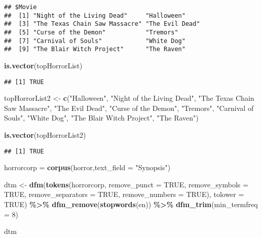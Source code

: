 \documentclass[
]{article}
\newenvironment{Shaded}{\begin{snugshade}}{\end{snugshade}}
\newcommand{\AttributeTok}[1]{\textcolor[rgb]{0.13,0.29,0.53}{#1}}
\newcommand{\ConstantTok}[1]{\textcolor[rgb]{0.56,0.35,0.01}{#1}}
\newcommand{\DecValTok}[1]{\textcolor[rgb]{0.00,0.00,0.81}{#1}}
\newcommand{\FunctionTok}[1]{\textcolor[rgb]{0.13,0.29,0.53}{\textbf{#1}}}
\newcommand{\NormalTok}[1]{#1}
\newcommand{\OtherTok}[1]{\textcolor[rgb]{0.56,0.35,0.01}{#1}}
\newcommand{\SpecialCharTok}[1]{\textcolor[rgb]{0.81,0.36,0.00}{\textbf{#1}}}
\newcommand{\StringTok}[1]{\textcolor[rgb]{0.31,0.60,0.02}{#1}}
\begin{document}
\begin{verbatim}
## $Movie
##  [1] "Night of the Living Dead"     "Halloween"                   
##  [3] "The Texas Chain Saw Massacre" "The Evil Dead"               
##  [5] "Curse of the Demon"           "Tremors"                     
##  [7] "Carnival of Souls"            "White Dog"                   
##  [9] "The Blair Witch Project"      "The Raven"
\end{verbatim}

\begin{Shaded}
\begin{Highlighting}[]
\FunctionTok{is.vector}\NormalTok{(topHorrorList)}
\end{Highlighting}
\end{Shaded}

\begin{verbatim}
## [1] TRUE
\end{verbatim}

\begin{Shaded}
\begin{Highlighting}[]
\NormalTok{topHorrorList2 }\OtherTok{\textless{}{-}} \FunctionTok{c}\NormalTok{(}\StringTok{"Halloween"}\NormalTok{, }\StringTok{"Night of the Living Dead"}\NormalTok{, }\StringTok{"The Texas Chain Saw Massacre"}\NormalTok{, }
                   \StringTok{"The Evil Dead"}\NormalTok{, }\StringTok{"Curse of the Demon"}\NormalTok{, }\StringTok{"Tremors"}\NormalTok{, }\StringTok{"Carnival of Souls"}\NormalTok{, }\StringTok{"White Dog"}\NormalTok{, }
                   \StringTok{"The Blair Witch Project"}\NormalTok{, }\StringTok{"The Raven"}\NormalTok{)}

\FunctionTok{is.vector}\NormalTok{(topHorrorList2)}
\end{Highlighting}
\end{Shaded}

\begin{verbatim}
## [1] TRUE
\end{verbatim}

\begin{Shaded}
\begin{Highlighting}[]
\NormalTok{horrorcorp }\OtherTok{=} \FunctionTok{corpus}\NormalTok{(horror,}\AttributeTok{text\_field =} \StringTok{"Synopsis"}\NormalTok{)}

\NormalTok{dtm }\OtherTok{\textless{}{-}} \FunctionTok{dfm}\NormalTok{(}\FunctionTok{tokens}\NormalTok{(horrorcorp, }\AttributeTok{remove\_punct =} \ConstantTok{TRUE}\NormalTok{, }
                  \AttributeTok{remove\_symbols =} \ConstantTok{TRUE}\NormalTok{, }
                  \AttributeTok{remove\_separators =} \ConstantTok{TRUE}\NormalTok{, }\AttributeTok{remove\_numbers =} \ConstantTok{TRUE}\NormalTok{), }\AttributeTok{tolower =} \ConstantTok{TRUE}\NormalTok{) }\SpecialCharTok{\%\textgreater{}\%}
  \FunctionTok{dfm\_remove}\NormalTok{(}\FunctionTok{stopwords}\NormalTok{(}\StringTok{\textquotesingle{}en\textquotesingle{}}\NormalTok{)) }\SpecialCharTok{\%\textgreater{}\%} 
  \FunctionTok{dfm\_trim}\NormalTok{(}\AttributeTok{min\_termfreq =} \DecValTok{8}\NormalTok{) }

\NormalTok{dtm}
\end{Highlighting}
\end{Shaded}
\end{document}
